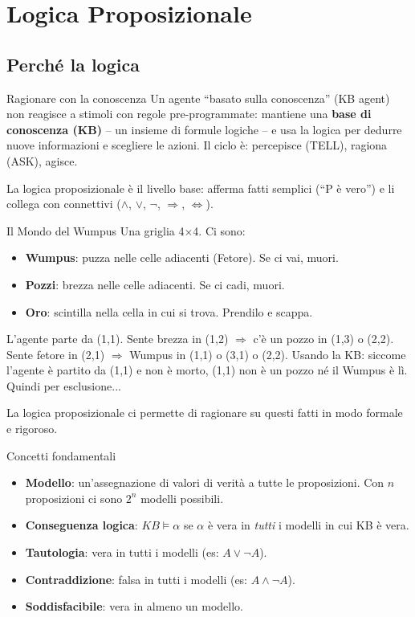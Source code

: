 \documentclass[12pt,a4paper]{article}
\begin{document}
\section{Logica Proposizionale}

\subsection{Perché la logica}

\begin{narrativo}{Ragionare con la conoscenza}
Un agente ``basato sulla conoscenza'' (KB agent) non reagisce a stimoli con regole pre-programmate: mantiene una \textbf{base di conoscenza (KB)} -- un insieme di formule logiche -- e usa la logica per dedurre nuove informazioni e scegliere le azioni. Il ciclo è: percepisce (TELL), ragiona (ASK), agisce.

La logica proposizionale è il livello base: afferma fatti semplici (``P è vero'') e li collega con connettivi ($\land$, $\lor$, $\neg$, $\Rightarrow$, $\Leftrightarrow$).
\end{narrativo}

\begin{esempio}{Il Mondo del Wumpus}
Una griglia 4$\times$4. Ci sono:
\begin{itemize}[noitemsep]
  \item \textbf{Wumpus}: puzza nelle celle adiacenti (Fetore). Se ci vai, muori.
  \item \textbf{Pozzi}: brezza nelle celle adiacenti. Se ci cadi, muori.
  \item \textbf{Oro}: scintilla nella cella in cui si trova. Prendilo e scappa.
\end{itemize}
L'agente parte da (1,1). Sente brezza in (1,2) $\Rightarrow$ c'è un pozzo in (1,3) o (2,2). Sente fetore in (2,1) $\Rightarrow$ Wumpus in (1,1) o (3,1) o (2,2). Usando la KB: siccome l'agente è partito da (1,1) e non è morto, (1,1) non è un pozzo né il Wumpus è lì. Quindi per esclusione...

La logica proposizionale ci permette di ragionare su questi fatti in modo formale e rigoroso.
\end{esempio}

\begin{narrativo}{Concetti fondamentali}
\begin{itemize}[noitemsep]
  \item \textbf{Modello}: un'assegnazione di valori di verità a tutte le proposizioni. Con $n$ proposizioni ci sono $2^n$ modelli possibili.
  \item \textbf{Conseguenza logica}: $KB \models \alpha$ se $\alpha$ è vera in \emph{tutti} i modelli in cui KB è vera.
  \item \textbf{Tautologia}: vera in tutti i modelli (es: $A \lor \neg A$).
  \item \textbf{Contraddizione}: falsa in tutti i modelli (es: $A \land \neg A$).
  \item \textbf{Soddisfacibile}: vera in almeno un modello.
\end{itemize}
\end{narrativo}
\end{document}
